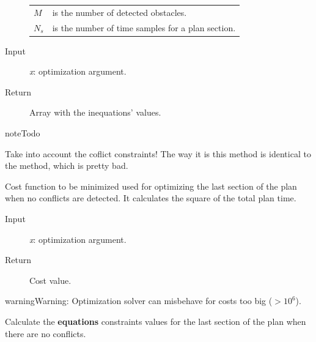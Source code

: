 \documentclass[letterpaper,10pt,english]{sphinxmanual}
\begin{document}
\begin{fulllineitems}
\begin{fulllineitems}
\begin{description}
\begin{tabulary}{\linewidth}{|L|L|}
\(M\)
 & 
is the number of detected obstacles.
\\

\(N_s\)
 & 
is the number of time samples for a plan section.
\\
\hline\end{tabulary}


\item[{Input}] \leavevmode
\emph{x}: optimization argument.

\item[{Return}] \leavevmode
Array with the inequations' values.

\end{description}

\begin{notice}{note}{Todo}

Take into account the coflict constraints!
The way it is this method is identical to the {\hyperref[Multi-robot motion planner:planning_sim.Robot._ls_sa_fieqcons]{}} method,
which is pretty bad.
\end{notice}

\end{fulllineitems}


\begin{fulllineitems}
\label{Multi-robot motion planner:planning_sim.Robot._ls_sa_criterion}
Cost function to be minimized used for optimizing
the last section of the plan when no conflicts are detected.
It calculates the square of the total plan time.
\begin{description}
\item[{Input}] \leavevmode
\emph{x}: optimization argument.

\item[{Return}] \leavevmode
Cost value.

\end{description}

\begin{notice}{warning}{Warning:}
Optimization solver can misbehave for costs too big (\(> 10^{6}\)).
\end{notice}

\end{fulllineitems}


\begin{fulllineitems}
\label{Multi-robot motion planner:planning_sim.Robot._ls_sa_feqcons}
Calculate the \textbf{equations} constraints values for the last section of the plan when
there are no conflicts.


\end{fulllineitems}
\end{fulllineitems}
\end{document}
